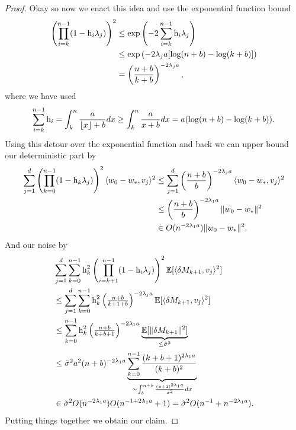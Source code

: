 \begin{proof}
	Okay so now we enact this idea and use the exponential function bound
	\begin{align}
		\nonumber
		\left(\prod_{i=k}^{n-1}(1-\text{h}_i\lambda_j)\right)^2
		&\le\exp\left(-2\sum_{i=k}^{n-1}\text{h}_i\lambda_j\right)\\
		\nonumber
		&\le \exp\left(-2\lambda_j a[\log(n+b)-\log(k+b)]\right)\\
		\label{eq: detour over exponential bound}
		&= \left(\frac{n+b}{k+b}\right)^{-2\lambda_j a},
	\end{align}
	where we have used
	\begin{align*}
		\sum_{i=k}^{n-1} \text{h}_i
		= \int_{k}^{n} \frac{a}{\lfloor x\rfloor+b} dx
		\ge \int_{k}^{n} \frac{a}{x+b} dx
		= a(\log(n+b) - \log(k+b)).
	\end{align*}
	Using this detour over the exponential function and back we can upper bound
	our deterministic part by
	\begin{align}
		\nonumber
		\sum_{j=1}^d\left(\prod_{k=0}^{n-1}(1-\text{h}_k\lambda_j)\right)^2
		\langle w_0-w_*, v_j\rangle^2
		&\le \sum_{j=1}^d \left(\frac{n+b}{b}\right)^{-2\lambda_j a}
		\langle w_0-w_*, v_j\rangle^2\\
		\label{eq: upper bound on convergence rate using smallest eigenvalue 1}
		&\le \left(\frac{n+b}{b}\right)^{-2\lambda_1 a}\|w_0-w_*\|^2\\
		\nonumber
		&\in O(n^{-2\lambda_1a})\|w_0-w_*\|^2.
	\end{align}
	And our noise by
	\begin{align}
		\nonumber
		&\sum_{j=1}^d\sum_{k=0}^{n-1} \text{h}_k^2
		\left(\prod_{i=k+1}^{n-1}(1-\text{h}_i\lambda_j)\right)^2
		\mathbb{E}[\langle\delta M_{k+1},v_j\rangle^2]\\
		\nonumber
		&\le \sum_{j=1}^d
			\sum_{k=0}^{n-1} \text{h}_k^2 \left(\tfrac{n+b}{k+1+b}\right)^{-2\lambda_j a}
			\mathbb{E}[\langle\delta M_{k+1},v_j\rangle^2]
		\\
		\label{eq: upper bound on convergence rate using smallest eigenvalue 2}
		&\le \sum_{k=0}^{n-1} \text{h}_k^2 \left(\tfrac{n+b}{k+b+1}\right)^{-2\lambda_1 a}
		\underbrace{\mathbb{E}[\|\delta M_{k+1}\|^2]}_{\le \tilde{\sigma}^2}
		\\
		\nonumber
		&\le
		\tilde{\sigma}^2a^2 (n+b)^{-2\lambda_1 a}
		\underbrace{\sum_{k=0}^{n-1} \frac{(k+b+1)^{2\lambda_1 a}}{(k+b)^2}}_{
			\sim \int_b^{n+b} \frac{(x+1)^{2\lambda_1 a}}{x^2}dx} \\
		\nonumber
		&\in \tilde{\sigma}^2 O(n^{-2\lambda_1 a})  O(n^{-1+2\lambda_1a} + 1)
		= \tilde{\sigma}^2 O(n^{-1} + n^{-2\lambda_1 a}).
	\end{align}
	Putting things together we obtain our claim.
\end{proof}
